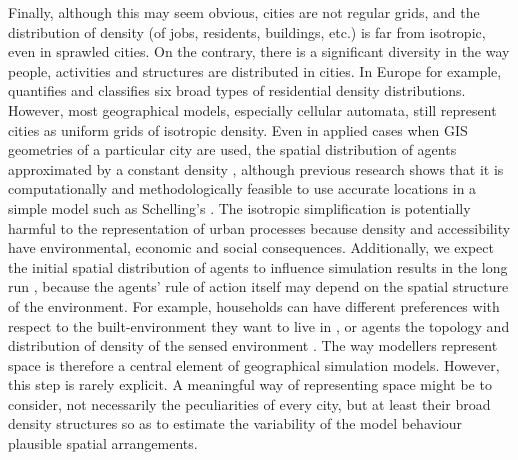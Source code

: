 \documentclass[preprint,5p,times,twocolumn,authoryear]{elsarticle}
\begin{document}
Finally, although this may seem obvious, cities are not regular grids, and the distribution of density (of jobs, residents, buildings, etc.) is far from isotropic, even in sprawled cities. On the contrary, there is a significant diversity in the way people, activities and structures are distributed in cities. In Europe for example, \citet{LeNechet2015} quantifies and classifies six broad types of residential density distributions. However, most geographical models, especially cellular automata, still represent cities as uniform grids of isotropic density. Even in applied cases when GIS geometries of a particular city are used, the spatial distribution of agents  approximated by a constant density \citep{arribas2014diverse}, although previous research shows that it is computationally and methodologically feasible to use accurate locations in a simple model such as Schelling's \citep{benenson2002entity}. The isotropic simplification is potentially harmful to the representation of urban processes because density and accessibility have environmental, economic and social consequences. Additionally, we expect the initial spatial distribution of agents to influence simulation results in the long run \citep{Castellanoetal2009}, because the agents' rule of action itself may depend on the spatial structure of the environment. For example, households can have different preferences with respect to the built-environment they  want to live in \citep{SpielmanHarrison2014}, or agents  the topology \citep{Banos2012} and distribution of density of the sensed environment \citep{LauriJaggi2003, FossettDietrich2009}. The way modellers represent  space is therefore a central element of geographical simulation models. However, this step is rarely explicit. A meaningful way of representing  space might be to consider, not necessarily the peculiarities of every city, but at least their broad density structures so as to estimate the variability of the model behaviour  plausible spatial arrangements.
\end{document}
